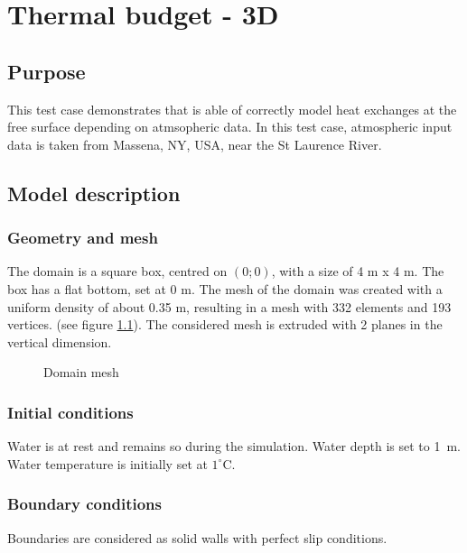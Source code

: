 \renewcommand{\labelitemi}{$\triangleright$}

\chapter{Thermal budget - 3D}
%
%
\section{Purpose}
This test case demonstrates that \khione is able of correctly model heat exchanges at the free surface depending on atmsopheric data. In this test case, atmospheric input data is taken from Massena, NY, USA, near the St Laurence River.

\section{Model description}

\subsection{Geometry and mesh}
The domain is a square box, centred on $(0;0)$, with a size of 4 m x 4 m. The box has a flat bottom, set at
0 m. The mesh of the domain was created with a uniform density of about 0.35 m, resulting in a mesh with 332
elements and 193 vertices. (see figure \ref{fig:thermal_mesh}). The considered mesh is extruded with 2 planes
in the vertical dimension.

\begin{figure}[H]
    \begin{center}
    \end{center}
    \caption{Domain mesh}
    \label{fig:thermal_mesh}
\end{figure}


\subsection{Initial conditions}
Water is at rest and remains so during the simulation. Water depth is set to 1~m.
Water temperature is initially set at $1^\circ$C.

\subsection{Boundary conditions}
Boundaries are considered as solid walls with perfect slip conditions.

